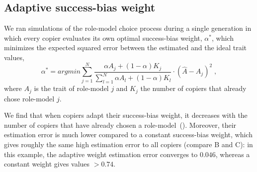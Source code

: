 \documentclass[12pt]{extarticle}
\begin{document}
\subsection{Adaptive success-bias weight}

We ran simulations of the role-model choice process during a single generation in which every copier evaluates its own optimal success-bias weight, $\alpha^*$, which minimizes the expected squared error between the estimated and the ideal trait values,
\begin{equation}
\alpha^* = \textit{argmin} \sum_{j=1}^N\frac{\alpha A_j + (1-\alpha) K_j}{\sum_{l=1}^N\alpha A_l + (1-\alpha) K_l}\cdot (\hat{A}-A_j)^2 \;,
\end{equation}
where $A_j$ is the trait of role-model $j$ and $K_j$ the number of copiers that already chose role-model $j$.

We find that when copiers adapt their success-bias weight, it decreases with the number of copiers that have already chosen a role-model~().
Moreover, their estimation error is much lower compared to a constant success-bias weight, which gives roughly the same high estimation error to all copiers (compare B and C): in this example, the adaptive weight estimation error converges to $0.046$, whereas a constant weight gives values $>0.74$.
\end{document}
